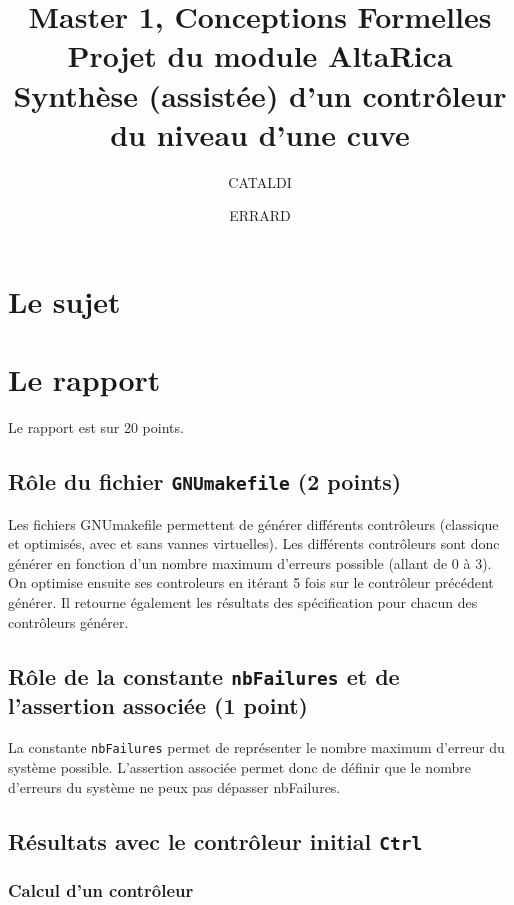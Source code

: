 \documentclass[a4paper]{book}
\newcommand{\altarica}{{\sc AltaRica}}
\begin{document}
\title{Master 1, Conceptions Formelles\\
Projet du module \altarica\\
Synthèse (assistée) d'un contrôleur du niveau d'une cuve}

\date{}

\author{CATALDI \and ERRARD}

\maketitle

\chapter{Le sujet}


\chapter{Le rapport}
Le rapport est sur 20 points.

\section{Rôle du fichier {\tt GNUmakefile} (2 points)}
Les fichiers GNUmakefile permettent de générer différents contrôleurs (classique et optimisés, avec et sans vannes virtuelles).
Les différents contrôleurs sont donc générer en fonction d'un nombre maximum d'erreurs possible (allant de 0 à 3).
On optimise ensuite ses controleurs en itérant 5 fois sur le contrôleur précédent générer.
Il retourne également les résultats des spécification pour chacun des contrôleurs générer.

\section{Rôle de la constante {\tt nbFailures} et de l'assertion associée (1 point)}
La constante {\tt nbFailures} permet de représenter le nombre maximum d'erreur du système possible.
L'assertion associée permet donc de définir que le nombre d'erreurs du système ne peux pas dépasser nbFailures. 

\section{Résultats avec le contrôleur initial {\tt Ctrl}}
\subsection{Calcul d'un contrôleur}
\end{document}
